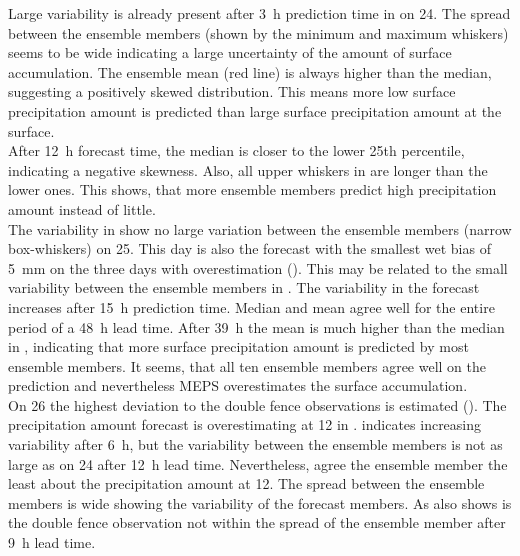 \noindent
Large variability is already present after \SI{3}{\hour} prediction time in  on \SI{24}{\dec}. The spread between the ensemble members (shown by the minimum and maximum whiskers) seems to be wide indicating a large uncertainty of the amount of surface accumulation. The ensemble mean (red line) is always higher than the median, suggesting a positively skewed distribution. 
This means more low surface precipitation amount is predicted than large surface precipitation amount at the surface.
\\
After \SI{12}{\hour} forecast time, the median is closer to the lower 25th percentile, indicating a negative skewness. Also, all upper whiskers in  are longer than the lower ones. %
This shows, that more ensemble members predict high precipitation amount instead of little.
\\
The variability in  show no large variation between the ensemble members (narrow box-whiskers) on \SI{25}{\dec}. This day is also the forecast with the smallest wet bias of \SI{5}{\mm} on the three days with overestimation (). This may be related to the small variability between the ensemble members in . 
The variability in the forecast increases after \SI{15}{\hour} prediction time. %
Median and mean agree well for the entire period of a \SI{48}{\hour} lead time. After \SI{39}{\hour} the mean is much higher than the median in , indicating that more surface precipitation amount is predicted by most ensemble members. %
It seems, that all ten ensemble members agree well on the prediction and nevertheless MEPS overestimates the surface accumulation. 
\\
On \SI{26}{\dec} the highest deviation to the double fence observations is estimated (). The precipitation amount forecast is overestimating at \SI{12}{\UTC} in .  indicates increasing variability after \SI{6}{\hour}, but the variability between the ensemble members is not as large as on \SI{24}{\dec} after \SI{12}{\hour} lead time. Nevertheless, agree the ensemble member the least about the precipitation amount at \SI{12}{\UTC}. The spread between the ensemble members is wide showing the variability of the forecast members. As  also shows is the double fence observation not within the spread of the ensemble member after \SI{9}{\hour} lead time. 
